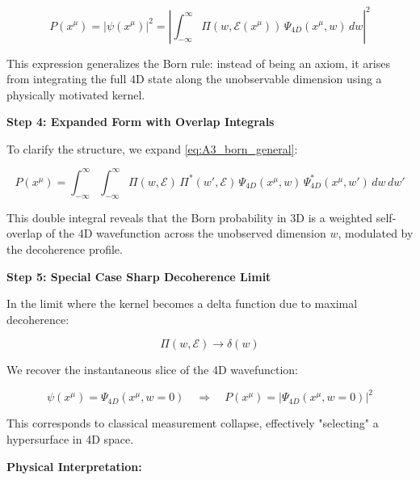 \documentclass[12pt]{article}
\begin{document}
\begin{equation}
P(x^\mu) = |\psi(x^\mu)|^2 = \left| \int_{-\infty}^{\infty} \Pi(w, \mathcal{E}(x^\mu))\, \Psi_{4D}(x^\mu, w)\, dw \right|^2
\label{eq:A3_born_general}
\end{equation}

This expression generalizes the Born rule: instead of being an axiom, it arises from integrating the full 4D state along the unobservable dimension using a physically motivated kernel.

\vspace{1em}
\noindent
\textbf{Step 4: Expanded Form with Overlap Integrals}

To clarify the structure, we expand \eqref{eq:A3_born_general}:

\begin{equation}
P(x^\mu) = \int_{-\infty}^{\infty} \int_{-\infty}^{\infty} \Pi(w, \mathcal{E})\, \Pi^*(w', \mathcal{E})\, \Psi_{4D}(x^\mu, w)\, \Psi^*_{4D}(x^\mu, w')\, dw\, dw'
\label{eq:A3_born_expanded}
\end{equation}

This double integral reveals that the Born probability in 3D is a weighted self-overlap of the 4D wavefunction across the unobserved dimension \(w\), modulated by the decoherence profile.

\vspace{1em}
\noindent
\textbf{Step 5: Special Case   Sharp Decoherence Limit}

In the limit where the kernel becomes a delta function due to maximal decoherence:

\begin{equation}
\Pi(w, \mathcal{E}) \rightarrow \delta(w)
\label{eq:A3_sharp_limit}
\end{equation}

We recover the instantaneous slice of the 4D wavefunction:

\begin{equation}
\psi(x^\mu) = \Psi_{4D}(x^\mu, w = 0) \quad \Rightarrow \quad P(x^\mu) = |\Psi_{4D}(x^\mu, w = 0)|^2
\label{eq:A3_sharp_projection}
\end{equation}

This corresponds to classical measurement collapse, effectively "selecting" a hypersurface in 4D space.

\vspace{1em}
\noindent
\textbf{Physical Interpretation:}
\end{document}
